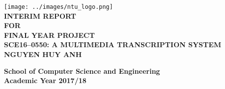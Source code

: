 \begin{titlepage}
\begin{center}

\texttt{[image: ../images/ntu\_logo.png]}
\\[4cm]

\uppercase{\textbf{Interim Report}\\
\textbf{for}\\
\textbf{Final Year Project}
\\[2cm]
\textbf{SCE16--0550: A Multimedia Transcription System}
\\[2cm]
\textbf{Nguyen Huy Anh}
}

\vfill

\textbf{School of Computer Science and Engineering}
\\
\textbf{Academic Year 2017/18}

\end{center}
\end{titlepage}

